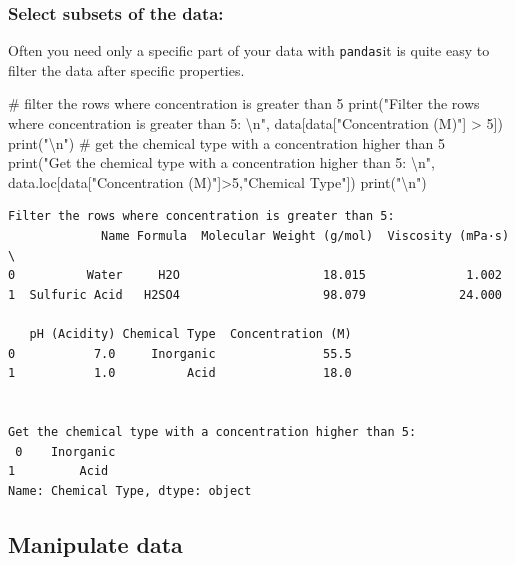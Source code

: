 \documentclass[
  letterpaper,
  DIV=11,
  numbers=noendperiod]{scrreprt}
\newenvironment{Shaded}{\begin{snugshade}}{\end{snugshade}}
\newcommand{\BuiltInTok}[1]{\textcolor[rgb]{0.00,0.23,0.31}{#1}}
\newcommand{\CharTok}[1]{\textcolor[rgb]{0.13,0.47,0.30}{#1}}
\newcommand{\CommentTok}[1]{\textcolor[rgb]{0.37,0.37,0.37}{#1}}
\newcommand{\DecValTok}[1]{\textcolor[rgb]{0.68,0.00,0.00}{#1}}
\newcommand{\NormalTok}[1]{\textcolor[rgb]{0.00,0.23,0.31}{#1}}
\newcommand{\OperatorTok}[1]{\textcolor[rgb]{0.37,0.37,0.37}{#1}}
\newcommand{\StringTok}[1]{\textcolor[rgb]{0.13,0.47,0.30}{#1}}
\begin{document}
\subsubsection*{Select subsets of the
data:}\label{select-subsets-of-the-data}

Often you need only a specific part of your data with \texttt{pandas}it
is quite easy to filter the data after specific properties.

\begin{Shaded}
\begin{Highlighting}[]
\CommentTok{\# filter the rows where concentration is greater than 5}
\BuiltInTok{print}\NormalTok{(}\StringTok{"Filter the rows where concentration is greater than 5: }\CharTok{\textbackslash{}n}\StringTok{"}\NormalTok{, data[data[}\StringTok{"Concentration (M)"}\NormalTok{] }\OperatorTok{\textgreater{}} \DecValTok{5}\NormalTok{]) }
\BuiltInTok{print}\NormalTok{(}\StringTok{"}\CharTok{\textbackslash{}n}\StringTok{"}\NormalTok{)}
\CommentTok{\# get the chemical type with a concentration higher than 5}
\BuiltInTok{print}\NormalTok{(}\StringTok{"Get the chemical type with a concentration higher than 5: }\CharTok{\textbackslash{}n}\StringTok{"}\NormalTok{, }
\NormalTok{      data.loc[data[}\StringTok{"Concentration (M)"}\NormalTok{]}\OperatorTok{\textgreater{}}\DecValTok{5}\NormalTok{,}\StringTok{"Chemical Type"}\NormalTok{])}
\BuiltInTok{print}\NormalTok{(}\StringTok{"}\CharTok{\textbackslash{}n}\StringTok{"}\NormalTok{)}
\end{Highlighting}
\end{Shaded}

\begin{verbatim}
Filter the rows where concentration is greater than 5: 
             Name Formula  Molecular Weight (g/mol)  Viscosity (mPa·s)  \
0          Water     H2O                    18.015              1.002   
1  Sulfuric Acid   H2SO4                    98.079             24.000   

   pH (Acidity) Chemical Type  Concentration (M)  
0           7.0     Inorganic               55.5  
1           1.0          Acid               18.0  


Get the chemical type with a concentration higher than 5: 
 0    Inorganic
1         Acid
Name: Chemical Type, dtype: object

\end{verbatim}

\subsection*{Manipulate data}\label{manipulate-data}
\end{document}
